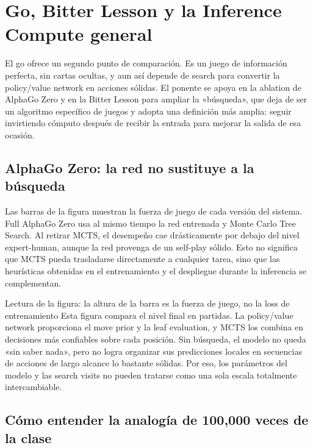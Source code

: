 \section{Go, Bitter Lesson y la Inference Compute general}

El go ofrece un segundo punto de comparación. Es un juego de información perfecta, sin cartas ocultas, y aun así depende de search para convertir la policy/value network en acciones sólidas. El ponente se apoya en la ablation de AlphaGo Zero y en la Bitter Lesson para ampliar la «búsqueda», que deja de ser un algoritmo específico de juegos y adopta una definición más amplia: seguir invirtiendo cómputo después de recibir la entrada para mejorar la salida de esa ocasión.

\subsection{AlphaGo Zero: la red no sustituye a la búsqueda}

Las barras de la figura muestran la fuerza de juego de cada versión del sistema. Full AlphaGo Zero usa al mismo tiempo la red entrenada y Monte Carlo Tree Search. Al retirar MCTS, el desempeño cae drásticamente por debajo del nivel expert-human, aunque la red provenga de un self-play sólido. Esto no significa que MCTS pueda trasladarse directamente a cualquier tarea, sino que las heurísticas obtenidas en el entrenamiento y el despliegue durante la inferencia se complementan.


\begin{knowledgebox}{Lectura de la figura: la altura de la barra es la fuerza de juego, no la loss de entrenamiento}
Esta figura compara el nivel final en partidas. La policy/value network proporciona el move prior y la leaf evaluation, y MCTS los combina en decisiones más confiables sobre cada posición. Sin búsqueda, el modelo no queda «sin saber nada», pero no logra organizar sus predicciones locales en secuencias de acciones de largo alcance lo bastante sólidas. Por eso, los parámetros del modelo y las search visits no pueden tratarse como una sola escala totalmente intercambiable.
\end{knowledgebox}

\subsection{Cómo entender la analogía de 100,000 veces de la clase}

